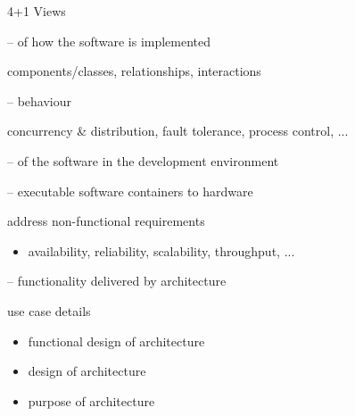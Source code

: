 \documentclass{slide}
\begin{document}
\begin{frame}{4+1 Views}

\Large{
\begin{description}
    \item<1->[Logical] --  of how the software is implemented
    \begin{itemize}
        \large{\item[$\bullet$] components/classes, relationships, interactions}
    \end{itemize}
    \item<2->[Process] --  behaviour
    \begin{itemize}
        \large{\item[$\bullet$] concurrency \& distribution, fault tolerance, process control, ...}
    \end{itemize}
    \item<3->[Development] --  of the software in the development environment
    \item<4->[Physical] --  executable software containers to hardware
    \begin{itemize}
        \large{\item[$\bullet$] address non-functional requirements}
        \begin{itemize}
            \item[$\bullet$] availability, reliability, scalability, throughput, ...
        \end{itemize}
    \end{itemize}
    \item<5->[Scenario] --  functionality delivered by architecture
    \begin{itemize}
        \large{\item[$\bullet$] use case details}
        \begin{itemize}
            \item[$\bullet$]  functional design of architecture
            \item[$\bullet$]  design of architecture
            \item[$\bullet$]  purpose of architecture
        \end{itemize}
    \end{itemize}
\end{description}
}

\end{frame}




\end{document}
